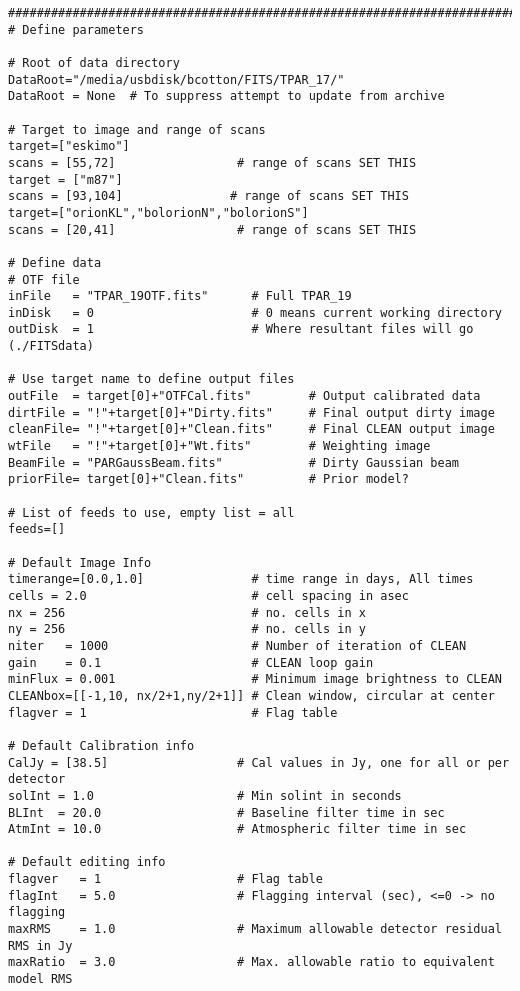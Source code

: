 \documentclass[11pt]{report}
\begin{document}
\begin{verbatim}
#######################################################################################
# Define parameters

# Root of data directory
DataRoot="/media/usbdisk/bcotton/FITS/TPAR_17/"
DataRoot = None  # To suppress attempt to update from archive

# Target to image and range of scans
target=["eskimo"]
scans = [55,72]                 # range of scans SET THIS
target = ["m87"]
scans = [93,104]               # range of scans SET THIS
target=["orionKL","bolorionN","bolorionS"]
scans = [20,41]                 # range of scans SET THIS

# Define data
# OTF file
inFile   = "TPAR_19OTF.fits"      # Full TPAR_19
inDisk   = 0                      # 0 means current working directory
outDisk  = 1                      # Where resultant files will go (./FITSdata)

# Use target name to define output files
outFile  = target[0]+"OTFCal.fits"        # Output calibrated data
dirtFile = "!"+target[0]+"Dirty.fits"     # Final output dirty image
cleanFile= "!"+target[0]+"Clean.fits"     # Final CLEAN output image
wtFile   = "!"+target[0]+"Wt.fits"        # Weighting image
BeamFile = "PARGaussBeam.fits"            # Dirty Gaussian beam
priorFile= target[0]+"Clean.fits"         # Prior model?

# List of feeds to use, empty list = all
feeds=[]

# Default Image Info
timerange=[0.0,1.0]               # time range in days, All times
cells = 2.0                       # cell spacing in asec
nx = 256                          # no. cells in x
ny = 256                          # no. cells in y
niter   = 1000                    # Number of iteration of CLEAN
gain    = 0.1                     # CLEAN loop gain
minFlux = 0.001                   # Minimum image brightness to CLEAN
CLEANbox=[[-1,10, nx/2+1,ny/2+1]] # Clean window, circular at center
flagver = 1                       # Flag table

# Default Calibration info
CalJy = [38.5]                  # Cal values in Jy, one for all or per detector
solInt = 1.0                    # Min solint in seconds
BLInt  = 20.0                   # Baseline filter time in sec
AtmInt = 10.0                   # Atmospheric filter time in sec

# Default editing info
flagver   = 1                   # Flag table
flagInt   = 5.0                 # Flagging interval (sec), <=0 -> no flagging
maxRMS    = 1.0                 # Maximum allowable detector residual RMS in Jy
maxRatio  = 3.0                 # Max. allowable ratio to equivalent model RMS


\end{verbatim}
\end{document}
